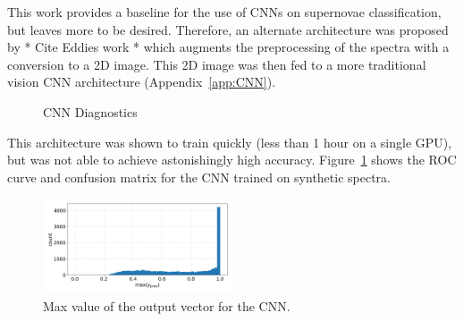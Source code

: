 This work provides a baseline for the use of CNNs on supernovae classification, 
but leaves more to be desired. Therefore, an alternate architecture was proposed 
by * Cite Eddies work * which augments the preprocessing of the spectra with 
a conversion to a 2D image. This 2D image was then fed to a more traditional vision 
CNN architecture (Appendix~\ref{app:CNN}). 
\begin{figure}[h]
    \centering
    \qquad
    \caption{CNN Diagnostics\label{fig:cnn_qual}}
\end{figure}
This architecture was shown to train quickly (less than 1 hour on a single GPU), 
but was not able to achieve astonishingly high accuracy. Figure~\ref{fig:cnn_qual}
shows the ROC curve and confusion matrix for the CNN trained on synthetic spectra. 
\begin{figure}[h]
    \centering
    \includegraphics[width=0.5\textwidth]{figures/cnn_max_ypred.png}
    \caption{Max value of the output vector for the CNN.\label{fig:cnn_max}}
\end{figure}

